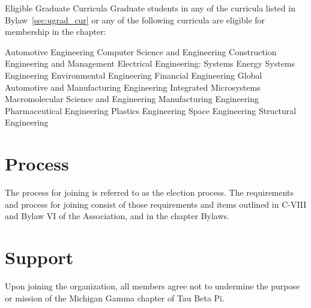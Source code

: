 \begin{enumsubsection}
\begin{enumsubsubsection}
 \end{enumsubsubsection}
\let\labelenumii\oldenumi
\item{Eligible Graduate Curricula} Graduate students in any of the curricula listed in Bylaw~\ref{sec:ugrad_cur} or any of the following curricula are eligible for membership in the chapter:
\let\oldenumi\labelenumii
\renewcommand{\labelenumii}{\arabic{enumii}.}
\begin{enumsubsubsection}
\itemnotoc Automotive Engineering
\itemnotoc Computer Science and Engineering
\itemnotoc Construction Engineering and Management
\itemnotoc Electrical Engineering: Systems
\itemnotoc Energy Systems Engineering
\itemnotoc Environmental Engineering
\itemnotoc Financial Engineering
\itemnotoc Global Automotive and Manufacturing Engineering
\itemnotoc Integrated Microsystems
\itemnotoc Macromolecular Science and Engineering
\itemnotoc Manufacturing Engineering
\itemnotoc Pharmaceutical Engineering
\itemnotoc Plastics Engineering
\itemnotoc Space Engineering
\itemnotoc Structural Engineering
\end{enumsubsubsection}
\let\labelenumii\oldenumi
\end{enumsubsection}

\section{Process} The process for joining is referred to as the election process. The requirements and process for joining consist of those requirements and items outlined in C-VIII and Bylaw VI of the Association, and in the chapter Bylaws.


\section{Support} Upon joining the organization, all members agree not to undermine the purpose or mission of the Michigan Gamma chapter of Tau Beta Pi.
